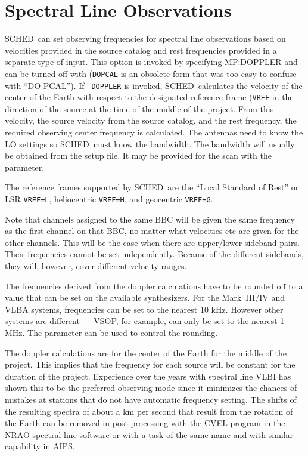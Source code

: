 \documentclass{report}
\newcommand{\schedb}{{\sc SCHED~}}
\begin{document}
\section{\label{SEC:LINE}Spectral Line Observations}

\schedb can set observing frequencies for spectral line observations
based on velocities provided in the source catalog and rest
frequencies provided in a separate type of input. This option is
invoked by specifying  {MP:DOPPLER} and can be
turned off with  ({\tt DOPCAL} is an
obsolete form that was too easy to confuse with ``DO PCAL'').  If {\tt
DOPPLER} is invoked, \schedb calculates the velocity of the center of
the Earth with respect to the designated reference frame ({\tt VREF}
in the direction of the source at the time of the middle of the
project. From this velocity, the source velocity from the source
catalog, and the rest frequency, the required observing center
frequency is calculated.  The antennas need to know the LO settings so
\schedb must know the bandwidth.  The bandwidth will usually be
obtained from the setup file.  It may be provided for the scan with
the  parameter.

The reference frames supported by \schedb are the ``Local Standard
of Rest'' or LSR {\tt VREF=L}, heliocentric {\tt VREF=H}, and
geocentric {\tt VREF=G}.

Note that channels assigned to the same BBC will be given the same
frequency as the first channel on that BBC, no matter what velocities
etc are given for the other channels.  This will be the case when
there are upper/lower sideband pairs.  Their frequencies cannot
be set independently.  Because of the different sidebands, they
will, however, cover different velocity ranges.

The frequencies derived from the doppler calculations have to be
rounded off to a value that can be set on the available synthesizers.
For the Mark~III/IV and VLBA systems, frequencies can be set to
the nearest 10 kHz.  However other systems are different --- VSOP, for
example, can only be set to the nearest 1 MHz.  The parameter
 can be used to control the rounding.

The doppler calculations are for the center of the Earth for the
middle of the project. This implies that the frequency for each source
will be constant for the duration of the project. Experience over the
years with spectral line VLBI has shown this to be the preferred
observing mode since it minimizes the chances of mistakes at stations
that do not have automatic frequency setting. The shifts of the
resulting spectra of about a km per second that result from the
rotation of the Earth can be removed in post-processing with the {\sc
CVEL} program in the NRAO spectral line software or with a task of the
same name and with similar capability in {\sc AIPS}.
\end{document}
